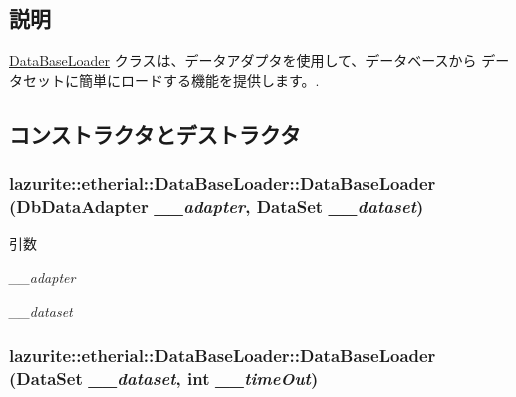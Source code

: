 \subsection{説明}
\hyperlink{classlazurite_1_1etherial_1_1_data_base_loader}{DataBaseLoader} クラスは、データアダプタを使用して、データベースから データセットに簡単にロードする機能を提供します。. 

\subsection{コンストラクタとデストラクタ}
\hypertarget{classlazurite_1_1etherial_1_1_data_base_loader_a1008de3808b48a9415aeddb84b506e7a}{
\subsubsection[{DataBaseLoader}]{\setlength{\rightskip}{0pt plus 5cm}lazurite::etherial::DataBaseLoader::DataBaseLoader (DbDataAdapter {\em \_\-\_\-adapter}, \/  DataSet {\em \_\-\_\-dataset})}}
\label{classlazurite_1_1etherial_1_1_data_base_loader_a1008de3808b48a9415aeddb84b506e7a}

\begin{DoxyParams}{引数}
\item[{\em \_\-\_\-adapter}]\item[{\em \_\-\_\-dataset}]\end{DoxyParams}
\hypertarget{classlazurite_1_1etherial_1_1_data_base_loader_a765c3fc303a0faeb62d3152947da5558}{
\subsubsection[{DataBaseLoader}]{\setlength{\rightskip}{0pt plus 5cm}lazurite::etherial::DataBaseLoader::DataBaseLoader (DataSet {\em \_\-\_\-dataset}, \/  int {\em \_\-\_\-timeOut})}}
\label{classlazurite_1_1etherial_1_1_data_base_loader_a765c3fc303a0faeb62d3152947da5558}

